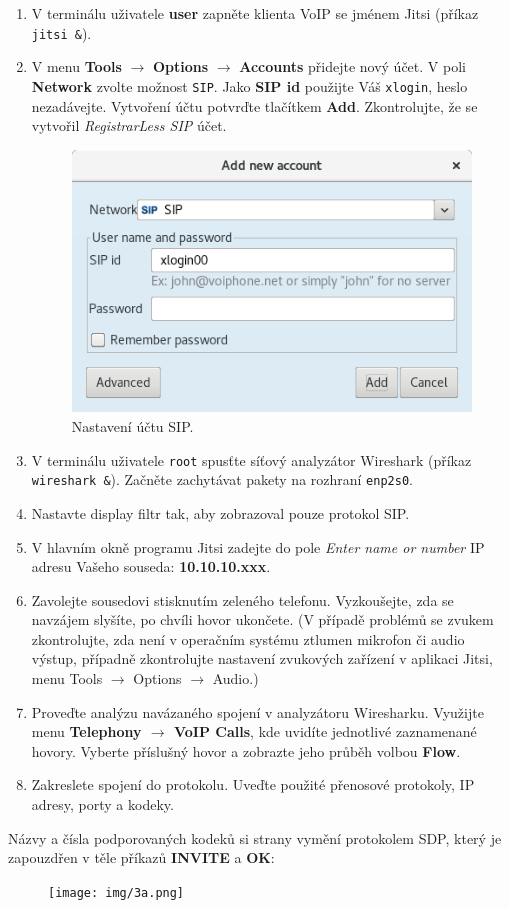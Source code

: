 \begin{enumerate}
    \item V terminálu uživatele {\bf user} zapněte klienta VoIP se jménem Jitsi (příkaz {\tt jitsi \&}).
    \item V menu {\bf Tools} $\rightarrow$ {\bf Options} $\rightarrow$ {\bf Accounts} přidejte nový účet. V poli {\bf Network} zvolte možnost {\tt SIP}. Jako {\bf SIP id} použijte Váš {\tt xlogin}, heslo nezadávejte.
    Vytvoření účtu potvrďte tlačítkem {\bf Add}. Zkontrolujte, že se vytvořil {\it RegistrarLess SIP} účet.
    \begin{figure}[h!]
    	\centering
    	\includegraphics[scale=0.5]{img/account_p2p.png}
    	\caption{Nastavení účtu SIP.}
    	\label{fig:sip_account}
    \end{figure}
    \item V terminálu uživatele {\tt root} spusťte síťový analyzátor Wireshark (příkaz {\tt wireshark \&}). Začněte zachytávat pakety na rozhraní {\tt enp2s0}.
    \item Nastavte display filtr tak, aby zobrazoval pouze protokol SIP.
    \item V hlavním okně programu Jitsi zadejte do pole {\it Enter name or number} IP adresu Vašeho souseda: {\bf 10.10.10.xxx}.
    \item Zavolejte sousedovi stisknutím zeleného telefonu. Vyzkoušejte, zda se navzájem slyšíte, po chvíli hovor ukončete.
      (V případě problémů se zvukem zkontrolujte, zda není v operačním systému ztlumen mikrofon či audio výstup, případně zkontrolujte nastavení zvukových zařízení v aplikaci Jitsi, menu Tools $\rightarrow$ Options $\rightarrow$ Audio.) 
    \item Proveďte analýzu navázaného spojení v analyzátoru Wiresharku. Využijte menu {\bf Telephony $\rightarrow$ VoIP Calls}, kde uvidíte jednotlivé zaznamenané hovory. Vyberte příslušný hovor a zobrazte jeho průběh volbou {\bf Flow}.
    \item Zakreslete spojení do protokolu. Uveďte použité přenosové protokoly, IP adresy, porty a kodeky.
\end{enumerate}
Názvy a čísla podporovaných kodeků si strany vymění protokolem SDP, který je zapouzdřen v těle příkazů {\bf INVITE} a {\bf OK}:
\begin{figure}[h!]
  \centering
  \texttt{[image: img/3a.png]}
\end{figure}

